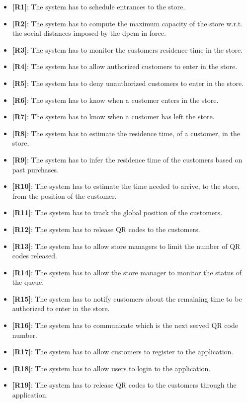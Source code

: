 \begin{itemize}

	\item {\textbf{[R1]}}: The system has to schedule entrances to the store.
	\item {\textbf{[R2]}}: The system has to compute the maximum capacity of the store w.r.t. the social distances imposed by the \gls{dpcm} in force.
	\item {\textbf{[R3]}}: The system has to monitor the customers residence time in the store.
	\item {\textbf{[R4]}}: The system has to allow authorized customers to enter in the store.
	\item {\textbf{[R5]}}: The system has to deny unauthorized customers to enter in the store.
	\item {\textbf{[R6]}}: The system has to know when a customer enters in the store.
	\item {\textbf{[R7]}}: The system has to know when a customer has left the store.
	\item {\textbf{[R8]}}: The system has to estimate the residence time, of a customer, in the store.
	\item {\textbf{[R9]}}: The system has to infer the residence time of the customers based on past purchases.
	\item {\textbf{[R10]}}: The system has to estimate the time needed to arrive, to the store, from the position of the customer.
	\item {\textbf{[R11]}}: The system has to track the global position of the customers.
	\item {\textbf{[R12]}}: The system has to release QR codes to the customers.
	\item {\textbf{[R13]}}: The system has to allow store managers to limit the number of QR codes released.
	\item {\textbf{[R14]}}: The system has to allow the store manager to monitor the status of the queue.
	\item {\textbf{[R15]}}: The system has to notify customers about the remaining time to be authorized to enter in the store.
	\item {\textbf{[R16]}}: The system has to communicate which is the next served QR code number.
	\item {\textbf{[R17]}}: The system has to allow customers to register to the application.
	\item {\textbf{[R18]}}: The system has to allow users to login to the application.
	\item {\textbf{[R19]}}: The system has to release QR codes to the customers through the application.

\end{itemize}
